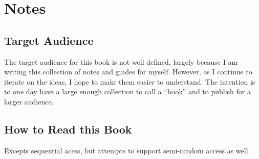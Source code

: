 \section{Notes}

\subsection{Target Audience}

\r{The target audience for this book is not well defined, largely because I am writing this collection of notes and guides for myself. However, as I continue to iterate on the ideas, I hope to make them easier to understand. The intention is to one day have a large enough collection to call a ``book'' and to publish for a larger audience.}

\subsection{How to Read this Book}
\r{Excepts sequential acess, but attempts to support semi-random access as well.}




